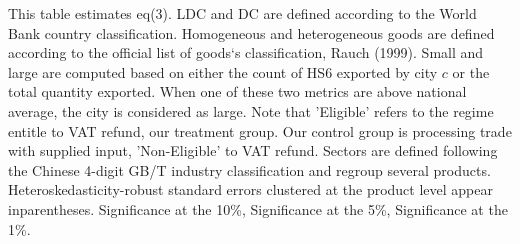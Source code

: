 \documentclass[preview]{standalone}
\begin{document}
\begin{table}[!htbp]
\begin{tablenotes}
This table estimates eq(3). 
LDC and DC are defined according to the World Bank country classification.
Homogeneous and heterogeneous goods are defined according to the official list of goods`s classification, Rauch (1999).
Small and large are computed based on either the count of HS6 exported by city $c$ or the total quantity exported.
When one of these two metrics are above national average, the city is considered as large.
Note that 'Eligible' refers to the regime entitle to VAT refund, our treatment group.
Our control group is processing trade with supplied input, 'Non-Eligible' to VAT refund.
Sectors are defined following the Chinese 4-digit GB/T industry
classification and regroup several products.
Heteroskedasticity-robust standard errors
clustered at the product level appear inparentheses.
\sym{*} Significance at the 10\%, \sym{**} Significance at the 5\%, \sym{***} Significance at the 1\%. 
\end{tablenotes}
\end{table}
\end{document}

